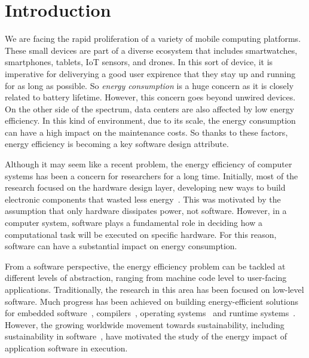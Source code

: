 \chapter{Introduction}\label{chp:introduction}


We are facing the rapid proliferation of a variety of mobile computing platforms. These small devices are part of a diverse ecosystem that includes smartwatches, smartphones, tablets, IoT sensors, and drones. In this sort of device, it is imperative for deliverying a good user expirence that they stay up and running for as long as possible. So \emph{energy consumption} is a huge concern as it is closely related to battery lifetime. However, this concern goes beyond unwired devices. On the other side of the spectrum, data centers are also affected by low energy efficiency. In this kind of environment, due to its scale, the energy consumption can have a high impact on the maintenance costs. So thanks to these factors, energy efficiency is becoming a key software design attribute.

Although it may seem like a recent problem, the energy efficiency of computer systems has been a concern for researchers for a long time. Initially, most of the research focused on the hardware design layer, developing new ways to build electronic components that wasted less energy~\cite{chandrakasan:1992}. This was motivated by the assumption that only hardware dissipates power, not software. However, in a computer system, software plays a fundamental role in deciding how a computational task will be executed on specific hardware. For this reason, software can have a substantial impact on energy consumption.

From a software perspective, the energy efficiency problem can be tackled at different levels of abstraction, ranging from machine code level to user-facing applications. Traditionally, the research in this area has been focused on low-level software. Much progress has been achieved on building energy-efficient solutions for embedded software~\cite{tiwari:1994}, compilers~\cite{hsu:2003}, operating systems~\cite{merkel:2006} and runtime systems~\cite{ribic:2014, farkas:2000}. However, the growing worldwide movement towards sustainability, including sustainability in software~\cite{becker:2015}, have motivated the study of the energy impact of application software in execution.

